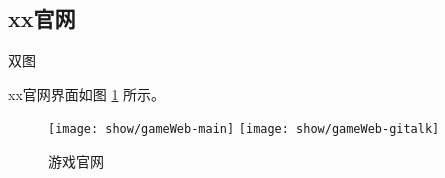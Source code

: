 \subsection{xx官网}

双图

xx官网界面如图 \ref{fig:gameWeb} 所示。

\begin{figure}[h]
  \centering%
    {\texttt{[image: show/gameWeb-main]}}%
  \hspace{4em}%
      {\texttt{[image: show/gameWeb-gitalk]}}
  \caption{游戏官网}
  \label{fig:gameWeb}
\end{figure}